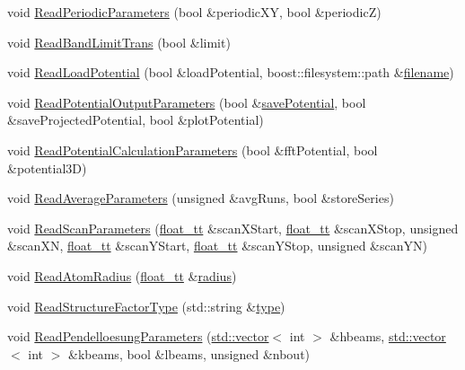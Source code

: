 \begin{DoxyCompactItemize}
\item 
void \hyperlink{class_q_s_t_e_m_1_1_c_qsc_reader_a1d166483e4b8db8751870980e76d32eb}{Read\-Periodic\-Parameters} (bool \&periodic\-X\-Y, bool \&periodic\-Z)
\item 
void \hyperlink{class_q_s_t_e_m_1_1_c_qsc_reader_a653f8191e9fd1db611cab4de89e37f08}{Read\-Band\-Limit\-Trans} (bool \&limit)
\item 
void \hyperlink{class_q_s_t_e_m_1_1_c_qsc_reader_a26f065d4a796640d0b622bf95e8506ba}{Read\-Load\-Potential} (bool \&load\-Potential, boost\-::filesystem\-::path \&\hyperlink{write_fields2_file_8m_af3723aa817dbb65282d5e1db81f08ad8}{filename})
\item 
void \hyperlink{class_q_s_t_e_m_1_1_c_qsc_reader_ac965f7fe42af8bbca9627e52c29fdbdd}{Read\-Potential\-Output\-Parameters} (bool \&\hyperlink{qstem_8m_a2627b1fe484f7e86e38deba8dabb27ed}{save\-Potential}, bool \&save\-Projected\-Potential, bool \&plot\-Potential)
\item 
void \hyperlink{class_q_s_t_e_m_1_1_c_qsc_reader_a7d7ef1d88e418cb903d24d2ef6afd19f}{Read\-Potential\-Calculation\-Parameters} (bool \&fft\-Potential, bool \&potential3\-D)
\item 
void \hyperlink{class_q_s_t_e_m_1_1_c_qsc_reader_ae4ea43676e9ac3ce232ad74e793c282a}{Read\-Average\-Parameters} (unsigned \&avg\-Runs, bool \&store\-Series)
\item 
void \hyperlink{class_q_s_t_e_m_1_1_c_qsc_reader_a8b0fc37c9340d20ebaf2bbc00fa2e216}{Read\-Scan\-Parameters} (\hyperlink{namespace_q_s_t_e_m_a915d7caa497280d9f927c4ce8d330e47}{float\-\_\-tt} \&scan\-X\-Start, \hyperlink{namespace_q_s_t_e_m_a915d7caa497280d9f927c4ce8d330e47}{float\-\_\-tt} \&scan\-X\-Stop, unsigned \&scan\-X\-N, \hyperlink{namespace_q_s_t_e_m_a915d7caa497280d9f927c4ce8d330e47}{float\-\_\-tt} \&scan\-Y\-Start, \hyperlink{namespace_q_s_t_e_m_a915d7caa497280d9f927c4ce8d330e47}{float\-\_\-tt} \&scan\-Y\-Stop, unsigned \&scan\-Y\-N)
\item 
void \hyperlink{class_q_s_t_e_m_1_1_c_qsc_reader_a9cfebcfd44975a80a7081a4a6bf2465e}{Read\-Atom\-Radius} (\hyperlink{namespace_q_s_t_e_m_a915d7caa497280d9f927c4ce8d330e47}{float\-\_\-tt} \&\hyperlink{_displacement_params_8m_acc620a89e606f875661525fd6365a421}{radius})
\item 
void \hyperlink{class_q_s_t_e_m_1_1_c_qsc_reader_aa859a85a0a2a6b955d1de9cc9b1cdc6d}{Read\-Structure\-Factor\-Type} (std\-::string \&\hyperlink{convert2cfg_8m_a2902a7a983ab04c79cae2162ad553481}{type})
\item 
void \hyperlink{class_q_s_t_e_m_1_1_c_qsc_reader_a31d8169148e61ae506648149527036ae}{Read\-Pendelloesung\-Parameters} (\hyperlink{qmb_8m_af54b69a32590de218622e869b06b47b3}{std\-::vector}$<$ int $>$ \&hbeams, \hyperlink{qmb_8m_af54b69a32590de218622e869b06b47b3}{std\-::vector}$<$ int $>$ \&kbeams, bool \&lbeams, unsigned \&nbout)

\end{DoxyCompactItemize}
